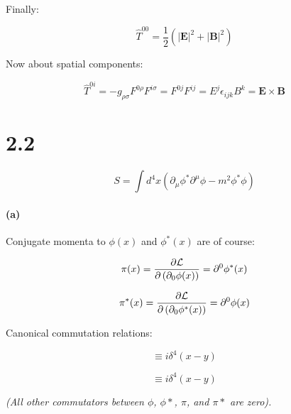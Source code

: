 \documentclass[11pt]{article}
\begin{document}
Finally:

\begin{equation}
\hat{T}^{00} =
  \frac{1}{2} \left( |\mathbf{E}|^2 + |\mathbf{B}|^2 \right)
\end{equation}

Now about spatial components:

\begin{equation}
\hat{T}^{0i} = -g_{\rho \sigma} F^{0 \rho} F^{i \sigma} =
  F^{0 j} F^{i j} = E^j \epsilon_{ijk} B^k =
  \mathbf{E} \times \mathbf{B}
\end{equation}

\pagebreak

\section*{2.2}

\begin{equation}
S = \int d^4 x \left(
  \partial_\mu \phi^* \partial^\mu \phi - m^2 \phi^* \phi \right)
\end{equation}

\paragraph*{(a)}

Conjugate momenta to $\phi(x)$ and $\phi^*(x)$ are of course:

\begin{equation}
\pi(x) =
  \frac{\partial {\cal{L}}}
    {\partial \left( \partial_0{\phi(x)} \right)} =
  \partial^0 \phi^*(x)
\end{equation}

\begin{equation}
\pi^*(x) =
  \frac{\partial {\cal{L}}}
    {\partial \left( \partial_0{\phi^*(x)} \right)} =
  \partial^0 \phi(x)
\end{equation}

Canonical commutation relations:

\begin{equation}
[ \phi(x), \pi(y) ] \equiv i \delta^4 (x - y)
\end{equation}

\begin{equation}
[ \phi^*(x), \pi^*(y) ] \equiv i \delta^4 (x - y)
\end{equation}

\textit{(All other commutators between $\phi$, $\phi*$, $\pi$, and
$\pi*$ are zero). }
\end{document}
